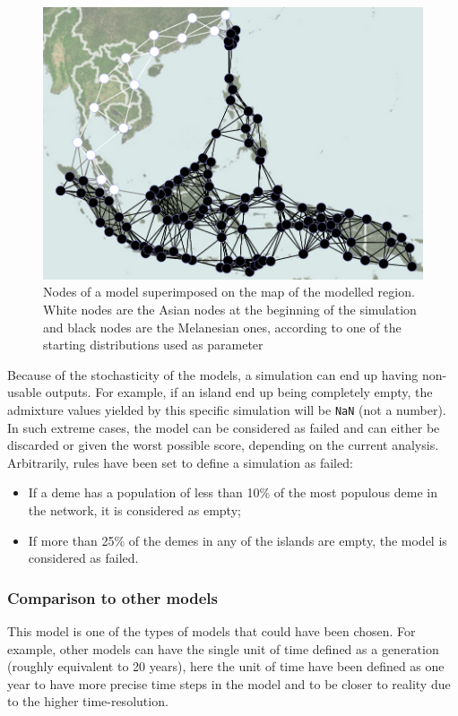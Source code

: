 \documentclass[a4paper,12pt]{report}
\begin{document}
\begin{figure}
	\centering
	\includegraphics[scale=0.45]{../data/ISEA-node-map.png}
	\caption{Nodes of a model superimposed on the map of the modelled region. White nodes are the Asian nodes at the beginning of the simulation and black nodes are the Melanesian ones, according to one of the starting distributions used as parameter}
	\label{nodesOnMap}
\end{figure}

Because of the stochasticity of the models, a simulation can end up having non-usable outputs. For example, if an island end up being completely empty, the admixture values yielded by this specific simulation will be \texttt{NaN} (not a number). In such extreme cases, the model can be considered as failed and can either be discarded or given the worst possible score, depending on the current analysis. Arbitrarily, rules have been set to define a simulation as failed:
\begin{itemize}
	\item If a deme has a population of less than 10\% of the most populous deme in the network, it is considered as empty;
	\item If more than 25\% of the demes in any of the islands are empty, the model is considered as failed.
\end{itemize}

\subsubsection{Comparison to other models}
This model is one of the types of models that could have been chosen. For example, other models can have the single unit of time defined as a generation (roughly equivalent to 20 years), here the unit of time have been defined as one year to have more precise time steps in the model and to be closer to reality due to the higher time-resolution.
\end{document}
